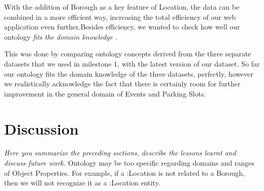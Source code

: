\documentclass[runningheads,a4paper]{../../StyleFiles/llncs}
\begin{document}
With the addition of Borough as a key feature of Location, the data can be combined in a more efficient way, increasing the total efficiency of our web application even further.Besides efficiency, we wanted to check how well our ontology \textit{fits the domain knowledge} \cite{brewster2004data}. 

This was done by comparing ontology concepts derived from the three separate datasets that we used in milestone 1, with the latest version of our dataset. 
So far our ontology fits the domain knowledge of the three datasets, perfectly, however we realistically acknowledge the fact that there is certainly room for further improvement in the general domain of Events and Parking Slots.


\section{Discussion}
\textit{Here you summarize the preceding sections, describe the lessons learnt and discuss future work.}
Ontology may be too specific regarding domains and ranges of Object Properties. For example, if a :Location is not related to a Borough, then we will not recognize it as a :Location entity. 




\end{document}
